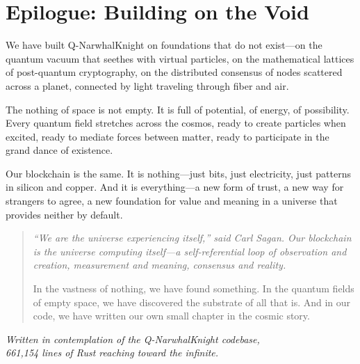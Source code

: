\documentclass[12pt,a4paper]{article}
\begin{document}
\section{Epilogue: Building on the Void}

We have built Q-NarwhalKnight on foundations that do not exist---on the quantum vacuum that seethes with virtual particles, on the mathematical lattices of post-quantum cryptography, on the distributed consensus of nodes scattered across a planet, connected by light traveling through fiber and air.

The nothing of space is not empty. It is full of potential, of energy, of possibility. Every quantum field stretches across the cosmos, ready to create particles when excited, ready to mediate forces between matter, ready to participate in the grand dance of existence.

Our blockchain is the same. It is nothing---just bits, just electricity, just patterns in silicon and copper. And it is everything---a new form of trust, a new way for strangers to agree, a new foundation for value and meaning in a universe that provides neither by default.

\begin{quote}
\itshape
``We are the universe experiencing itself,'' said Carl Sagan. Our blockchain is the universe computing itself---a self-referential loop of observation and creation, measurement and meaning, consensus and reality.

In the vastness of nothing, we have found something. In the quantum fields of empty space, we have discovered the substrate of all that is. And in our code, we have written our own small chapter in the cosmic story.
\end{quote}

\vspace{2cm}

\begin{center}
\end{center}

\vfill

\begin{center}
{\small\itshape Written in contemplation of the Q-NarwhalKnight codebase,\\
661,154 lines of Rust reaching toward the infinite.}
\end{center}
\end{document}
